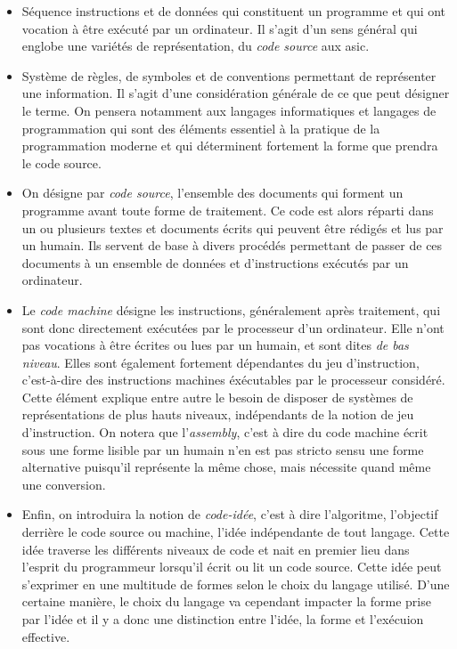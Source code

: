 \documentclass[12pt]{article} %
\begin{document}
\begin{itemize}
    \item Séquence instructions et de données qui constituent un programme et qui ont vocation à être exécuté par un ordinateur. Il s'agit d'un sens général qui englobe une variétés de représentation, du \textit{code source} aux \acrfull{asic}.
    \item Système de règles, de symboles et de conventions permettant de représenter une information. Il s'agit d'une considération générale de ce que peut désigner le terme. On pensera notamment aux langages informatiques et langages de programmation qui sont des éléments essentiel à la pratique de la programmation moderne et qui déterminent fortement la forme que prendra le code source.
    \item On désigne par \textit{code source}, l'ensemble des documents qui forment un programme avant toute forme de traitement. Ce code est alors réparti dans un ou plusieurs textes et documents écrits qui peuvent être rédigés et lus par un humain. Ils servent de base à divers procédés permettant de passer de ces documents à un ensemble de données et d'instructions exécutés par un ordinateur. 
    \item Le \textit{code machine} désigne les instructions, généralement après traitement, qui sont donc directement exécutées par le processeur d'un ordinateur. Elle n'ont pas vocations à être écrites ou lues par un humain, et sont dites \textit{de bas niveau}. Elles sont également fortement dépendantes du jeu d'instruction, c'est-à-dire des instructions machines éxécutables par le processeur considéré. Cette élément explique entre autre le besoin de disposer de systèmes de représentations de plus hauts niveaux, indépendants de la notion de jeu d'instruction. On notera que l'\textit{assembly}, c'est à dire du code machine écrit sous une forme lisible par un humain n'en est pas stricto sensu une forme alternative puisqu'il représente la même chose, mais nécessite quand même une conversion.
    \item Enfin, on introduira la notion de \textit{code-idée}, c'est à dire l'algoritme, l'objectif derrière le code source ou machine, l'idée indépendante de tout langage. Cette idée traverse les différents niveaux de code et nait en premier lieu dans l'esprit du programmeur lorsqu'il écrit ou lit un code source. Cette idée peut s'exprimer en une multitude de formes selon le choix du langage utilisé. D'une certaine manière, le choix du langage va cependant impacter la forme prise par l'idée et il y a donc une distinction entre l'idée, la forme et l'exécuion effective.
\end{itemize}
\end{document}
